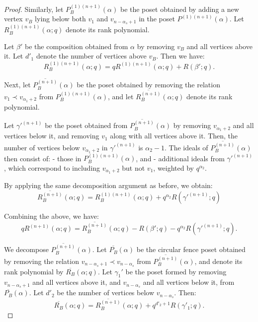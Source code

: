 \documentclass{article}
\theoremstyle{remark}
\begin{document}
\begin{proof}
    Similarly, let \( P_B^{(1)(n+1)}(\alpha) \) be the poset obtained by adding a new vertex \( v_B \) lying below both \( v_1 \) and \( v_{n-\alpha_s+1} \) in the poset \( P^{(1)(n+1)}(\alpha) \). Let \( R_B^{(1)(n+1)}(\alpha; q) \) denote its rank polynomial. 

    Let \( \beta' \) be the composition obtained from \( \alpha \) by removing \( v_B \) and all vertices above it.  Let \( d'_1 \) denote the number of vertices above \( v_B \). Then we have:
    \[
    R_B^{(1)(n+1)}(\alpha; q) = qR^{(1)(n+1)}(\alpha; q) +  R(\beta'; q).
    \]

    Next, let \( \overline{P_B^{(n+1)}}(\alpha) \) be the poset obtained by removing the relation \( v_{1} \prec v_{\alpha_1 + 2} \) from \( P_B^{(1)(n+1)}(\alpha) \), and let \( \overline{R_B^{(n+1)}}(\alpha; q) \) denote its rank polynomial.

    Let \( \gamma'^{(n+1)} \) be the poset obtained from \( \overline{P_B^{(n+1)}}(\alpha) \) by removing \( v_{\alpha_1+2} \) and all vertices below it, and removing \( v_{1} \) along with all vertices above it. Then, the number of vertices below \( v_{\alpha_1+2} \) in $\gamma'^{(n+1)}$ is $\alpha_2-1$. The ideals of \( \overline{P_B^{(n+1)}}(\alpha) \) then consist of:
    - those in \( P_B^{(1)(n+1)}(\alpha) \), and
    - additional ideals from \( \gamma'^{(n+1)} \), which correspond to including \( v_{\alpha_1+2}\) but not \( v_{1} \), weighted by \( q^{\alpha_2} \).

 By applying the same decomposition argument as before, we obtain:
\[\overline{R^{(n+1)}_B}(\alpha; q) = R_B^{(1)(n+1)}(\alpha; q) + q^{\alpha_2} R(\gamma'^{(n+1)}; q)\] 

Combining the above, we have:
\[
q R^{(n+1)}(\alpha; q) = \overline{R_B^{(n+1)}}(\alpha; q) - R(\beta'; q) - q^{\alpha_2} R(\gamma'^{(n+1)}; q).
\]

We decompose \( \overline{P_B^{(n+1)}}(\alpha) \). Let \( \overline{P_B}(\alpha) \) be the circular fence poset obtained by removing the relation \( v_{n-\alpha_s+1} \prec v_{n-\alpha_s} \) from \( \overline{P_B^{(n+1)}}(\alpha) \), and denote its rank polynomial by \( \overline{R_B}(\alpha; q) \). Let \( \gamma_1' \) be the poset formed by removing \( v_{n -\alpha_s+1} \) and all vertices above it, and \( v_{n-\alpha_s} \) and all vertices below it, from \( \overline{P_B}(\alpha) \). Let $d'_2$ be the number of vertices below $v_{n-\alpha_s}$. Then:
\[
\overline{R_B}(\alpha; q) = \overline{R_B^{(n+1)}}(\alpha; q) + q^{d'_2 + 1} R(\gamma'_1; q).
\]


\end{proof}
\end{document}

